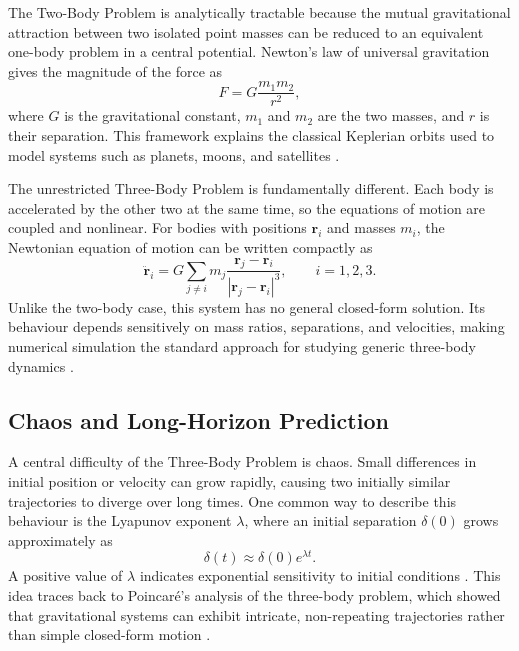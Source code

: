 \documentclass[12pt]{article}
\begin{document}
The Two-Body Problem is analytically tractable because the mutual gravitational attraction
between two isolated point masses can be reduced to an equivalent one-body problem in a
central potential. Newton's law of universal gravitation gives the magnitude of the force as
\begin{equation}
F = G\frac{m_1m_2}{r^2},
\end{equation}
where $G$ is the gravitational constant, $m_1$ and $m_2$ are the two masses, and $r$ is their
separation. This framework explains the classical Keplerian orbits used to model systems
such as planets, moons, and satellites \cite{murray1999solar}.

The unrestricted Three-Body Problem is fundamentally different. Each body is accelerated
by the other two at the same time, so the equations of motion are coupled and nonlinear.
For bodies with positions $\mathbf r_i$ and masses $m_i$, the Newtonian equation of motion
can be written compactly as
\begin{equation}
\ddot{\mathbf r}_i =
G\sum_{j\ne i} m_j
\frac{\mathbf r_j-\mathbf r_i}{|\mathbf r_j-\mathbf r_i|^3},
\qquad i=1,2,3.
\end{equation}
Unlike the two-body case, this system has no general closed-form solution. Its behaviour
depends sensitively on mass ratios, separations, and velocities, making numerical simulation
the standard approach for studying generic three-body dynamics \cite{murray1999solar}.

\subsection{Chaos and Long-Horizon Prediction}
\label{sec:chaos}

A central difficulty of the Three-Body Problem is chaos. Small differences in initial position
or velocity can grow rapidly, causing two initially similar trajectories to diverge over long
times. One common way to describe this behaviour is the Lyapunov exponent $\lambda$, where
an initial separation $\delta(0)$ grows approximately as
\begin{equation}
\delta(t) \approx \delta(0)e^{\lambda t}.
\end{equation}
A positive value of $\lambda$ indicates exponential sensitivity to initial conditions \cite{ott2002chaos}.
This idea traces back to Poincar\'e's analysis of the three-body problem, which showed that
gravitational systems can exhibit intricate, non-repeating trajectories rather than simple
closed-form motion \cite{poincare1890sur}.
\end{document}
